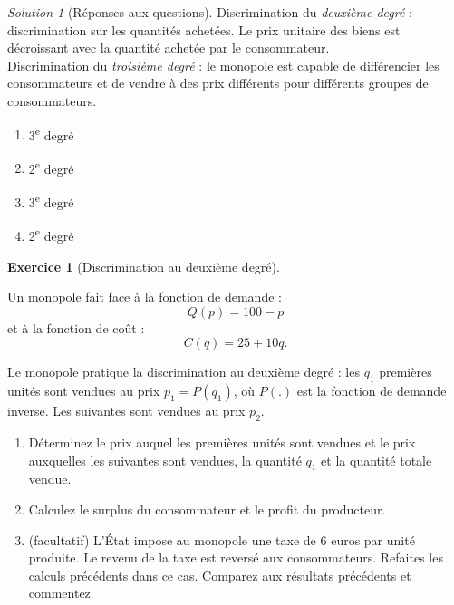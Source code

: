 \documentclass[
]{book}
\providecommand{\tightlist}{%
  \setlength{\itemsep}{0pt}\setlength{\parskip}{0pt}}
\theoremstyle{definition}
\theoremstyle{definition}
\theoremstyle{definition}
\newtheorem{exercise}{Exercice}[chapter]
\theoremstyle{definition}
\theoremstyle{remark}
\newtheorem*{solution}{Solution}
\begin{document}
\begin{solution}[Réponses aux questions]

Discrimination du \emph{deuxième degré} : discrimination sur les quantités achetées.
Le prix unitaire des biens est décroissant avec la quantité achetée par le consommateur.\\
Discrimination du \emph{troisième degré} : le monopole est capable de différencier les consommateurs et de vendre à des prix différents pour différents groupes de consommateurs.

\begin{enumerate}
\def\labelenumi{\arabic{enumi}.}
\tightlist
\item
  3\textsuperscript{e} degré
\item
  2\textsuperscript{e} degré
\item
  3\textsuperscript{e} degré
\item
  2\textsuperscript{e} degré
\end{enumerate}

\end{solution}

\begin{exercise}[Discrimination au deuxième degré]
\protect\hypertarget{exr:discriminationexo1}{}\label{exr:discriminationexo1}

Un monopole fait face à la fonction de demande :
\[Q(p)=100-p\] et à la fonction de coût :
\[C(q)=25+10q.\]

Le monopole pratique la discrimination au deuxième degré : les \(q_1\) premières unités sont vendues au prix \(p_1=P(q_1)\), où \(P\left(.\right)\) est la fonction de demande inverse. Les suivantes sont vendues au prix \(p_2\).

\begin{enumerate}
\def\labelenumi{\arabic{enumi}.}
\tightlist
\item
  Déterminez le prix auquel les premières unités sont vendues et le prix auxquelles les suivantes sont vendues, la quantité \(q_1\) et la quantité totale vendue.
\item
  Calculez le surplus du consommateur et le profit du producteur.
\item
  (facultatif) L'État impose au monopole une taxe de 6 euros par unité produite. Le revenu de la taxe est reversé aux consommateurs. Refaites les calculs précédents dans ce cas. Comparez aux résultats précédents et commentez.
\end{enumerate}

\end{exercise}
\end{document}
